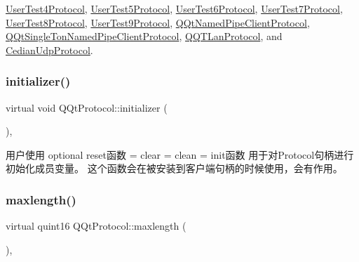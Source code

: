 \mbox{\hyperlink{class_user_test4_protocol_abe4cc53430dfa8c30c15bd0ba94c94b2}{User\+Test4\+Protocol}}, \mbox{\hyperlink{class_user_test5_protocol_aceda8201395278798ed1a24947c7a514}{User\+Test5\+Protocol}}, \mbox{\hyperlink{class_user_test6_protocol_a628f7c67f9dcbcec326c3289302a9868}{User\+Test6\+Protocol}}, \mbox{\hyperlink{class_user_test7_protocol_a5ed3c0a46b0dc290b3731f52a45654e0}{User\+Test7\+Protocol}}, \mbox{\hyperlink{class_user_test8_protocol_a008eb4af8499545f3895600cc5c95710}{User\+Test8\+Protocol}}, \mbox{\hyperlink{class_user_test9_protocol_a0c3c92b88bce2ea35a8b3e7da7b4044f}{User\+Test9\+Protocol}}, \mbox{\hyperlink{class_q_qt_named_pipe_client_protocol_a8aca95f5a834ba308097681bf04ea741}{Q\+Qt\+Named\+Pipe\+Client\+Protocol}}, \mbox{\hyperlink{class_q_qt_single_ton_named_pipe_client_protocol_a34cdea5f2034d0e18995ff1c9753e0b7}{Q\+Qt\+Single\+Ton\+Named\+Pipe\+Client\+Protocol}}, \mbox{\hyperlink{class_q_q_t_lan_protocol_ac2fc1658a5c00670974f4e845226c419}{Q\+Q\+T\+Lan\+Protocol}}, and \mbox{\hyperlink{class_cedian_udp_protocol_ad9dfd948a1a10f445d75ccc869b3bc52}{Cedian\+Udp\+Protocol}}.

\mbox{\label{class_q_qt_protocol_ad4caa7aadbb04320acc7d653956f51cb}} 
\subsubsection{\texorpdfstring{initializer()}{initializer()}}
{\footnotesize\ttfamily virtual void Q\+Qt\+Protocol\+::initializer (\begin{DoxyParamCaption}{ }\end{DoxyParamCaption})\hspace{0.3cm}{\ttfamily [inline]}, {\ttfamily [virtual]}}

用户使用 optional reset函数 = clear = clean = init函数 用于对\+Protocol句柄进行初始化成员变量。 这个函数会在被安装到客户端句柄的时候使用，会有作用。 \mbox{\label{class_q_qt_protocol_af41bc3116abbbcfc9af45e151a253ff7}} 
\subsubsection{\texorpdfstring{maxlength()}{maxlength()}}
{\footnotesize\ttfamily virtual quint16 Q\+Qt\+Protocol\+::maxlength (\begin{DoxyParamCaption}{ }\end{DoxyParamCaption})\hspace{0.3cm}{\ttfamily [inline]}, {\ttfamily [virtual]}}



